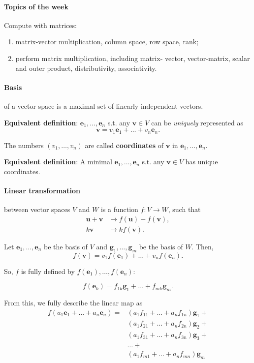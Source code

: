 \documentclass{article}
\begin{document}
\paragraph{Topics of the week} Compute with matrices:  

\begin{enumerate}
    \item matrix-vector multiplication, column space, row space, rank;
    \item perform matrix multiplication, including matrix- vector, vector-matrix, scalar and outer product, distributivity, associativity.
\end{enumerate}

\paragraph{Basis} of a vector space is a maximal set of linearly independent vectors.

\textbf{Equivalent definition}: $\mathbf e_1, \dots, \mathbf e_n$ s.t. any $\mathbf v \in V$ can be \textit{uniquely} represented as
$$
\mathbf v = v_1 \mathbf e_1 + \dots + v_n \mathbf e_n.
$$

The numbers $(v_1,\dots,v_n)$ are called \textbf{coordinates} of $\mathbf v$ in $\mathbf e_1,\dots,\mathbf e_n$.

\textbf{Equivalent definition}: A minimal $\mathbf e_1, \dots, \mathbf e_n$ s.t. any $\mathbf v \in V$ has unique coordinates.

\paragraph{Linear transformation} between vector spaces $V$ and $W$ is a function $f : V \to W$, such that
\begin{align*}
\mathbf u + \mathbf v &\mapsto f(\mathbf u) + f(\mathbf v), \\
k \mathbf v  &\mapsto k f(\mathbf v).
\end{align*}

Let $\mathbf e_1,\dots, \mathbf e_n$ be the basis of $V$ and $\mathbf g_1, \dots, \mathbf g_m$ be the basis of $W$. Then,
$$
f(\mathbf v) = v_1 f(\mathbf e_1) + \dots + v_n f(\mathbf e_n).
$$

So, $f$ is fully defined by $f(\mathbf e_1), \dots, f(\mathbf e_n)$:

$$
f(\mathbf e_k) = f_{1k} \mathbf g_1 + \dots + f_{mk} \mathbf g_m.
$$

From this, we fully describe the linear map as
\begin{align*}
f(a_1 \mathbf e_1 + \dots + a_n \mathbf e_n) =& (a_1 f_{11} + \dots + a_n f_{1n}) \mathbf g_1 + \\
& (a_1 f_{21} + \dots + a_n f_{2n}) \mathbf g_2 + \\
& (a_1 f_{31} + \dots + a_n f_{3n}) \mathbf g_3 + \\
& \dots + \\
& (a_1 f_{m1} + \dots + a_n f_{mn}) \mathbf g_m \\
\end{align*}
\end{document}
